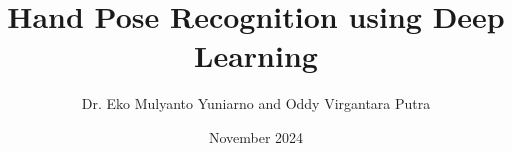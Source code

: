 \documentclass[a4paper,12pt]{book}
\begin{document}
\author{Dr. Eko Mulyanto Yuniarno and Oddy Virgantara Putra}
\title{Hand Pose Recognition using Deep Learning}
\date{November 2024}

\frontmatter
\maketitle
\tableofcontents

\mainmatter






\backmatter



\end{document}
